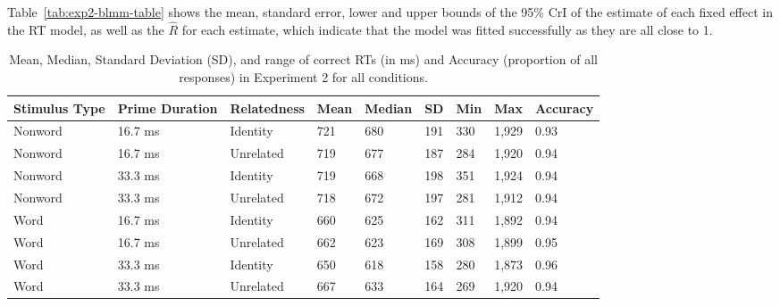 \documentclass[
  english,
  man,floatsintext]{apa6}
\begin{document}
Table~\ref{tab:exp2-blmm-table} shows the mean, standard error, lower and upper bounds of the 95\% CrI of the estimate of each fixed effect in the RT model, as well as the \(\hat{R}\) for each estimate, which indicate that the model was fitted successfully as they are all close to 1.

\newpage





\begin{table}[tbp]

\begin{center}
\begin{threeparttable}

\caption{\label{tab:exp2-descriptive-rt-table}Mean, Median, Standard Deviation (SD), and range of correct RTs (in ms) and Accuracy (proportion of all responses) in Experiment 2 for all conditions.}

\begin{tabular}{lllllllll}
\toprule
Stimulus Type & \multicolumn{1}{c}{Prime Duration} & \multicolumn{1}{c}{Relatedness} & \multicolumn{1}{c}{Mean} & \multicolumn{1}{c}{Median} & \multicolumn{1}{c}{SD} & \multicolumn{1}{c}{Min} & \multicolumn{1}{c}{Max} & \multicolumn{1}{c}{Accuracy}\\
\midrule
Nonword & 16.7 ms & Identity & 721 & 680 & 191 & 330 & 1,929 & 0.93\\
Nonword & 16.7 ms & Unrelated & 719 & 677 & 187 & 284 & 1,920 & 0.94\\
Nonword & 33.3 ms & Identity & 719 & 668 & 198 & 351 & 1,924 & 0.94\\
Nonword & 33.3 ms & Unrelated & 718 & 672 & 197 & 281 & 1,912 & 0.94\\
Word & 16.7 ms & Identity & 660 & 625 & 162 & 311 & 1,892 & 0.94\\
Word & 16.7 ms & Unrelated & 662 & 623 & 169 & 308 & 1,899 & 0.95\\
Word & 33.3 ms & Identity & 650 & 618 & 158 & 280 & 1,873 & 0.96\\
Word & 33.3 ms & Unrelated & 667 & 633 & 164 & 269 & 1,920 & 0.94\\
\bottomrule
\end{tabular}

\end{threeparttable}
\end{center}

\end{table}
\end{document}

